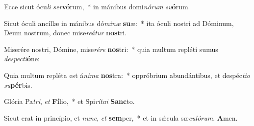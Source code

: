 Ecce sicut ócu\textit{li} \textit{ser}\textbf{vó}rum,~* in mánibus domi\textit{nó}\textit{rum} \textit{su}\textbf{ó}rum.

Sicut óculi ancíllæ in mánibus dó\textit{mi}\textit{næ} \textbf{su}æ:~* ita óculi nostri ad Dóminum, Deum nostrum, donec mise\textit{re}\textit{á}\textit{tur} \textbf{nos}tri.

Miserére nostri, Dómine, mise\textit{ré}\textit{re} \textbf{nos}tri:~* quia multum repléti sumus \textit{de}\textit{spec}\textit{ti}\textbf{ó}ne:

Quia multum repléta est á\textit{ni}\textit{ma} \textbf{nos}tra:~* oppróbrium abundántibus, et despéc\textit{ti}\textit{o} \textit{su}\textbf{pér}bis.

Glória Pa\textit{tri}, \textit{et} \textbf{Fí}lio,~* et Spi\textit{rí}\textit{tu}\textit{i} \textbf{Sanc}to.

Sicut erat in princípio, et \textit{nunc}, \textit{et} \textbf{sem}per,~* et in sǽcula sæ\textit{cu}\textit{ló}\textit{rum}. \textbf{A}men.

